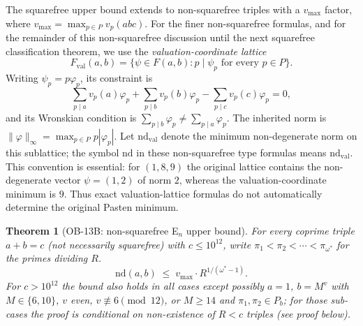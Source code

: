 \documentclass[12pt]{article}
\newtheorem{theorem}{Theorem}
\theoremstyle{definition}
\begin{document}
The squarefree upper bound extends to non-squarefree triples with a
$v_{\max}$ factor, where $v_{\max} = \max_{p \in P} v_p(abc)$.
For the finer non-squarefree formulas, and for the remainder of this
non-squarefree discussion until the next squarefree classification theorem,
we use the \emph{valuation-coordinate lattice}
\[
  F_{\mathrm{val}}(a,b)
  =\{\psi\in F(a,b): p\mid \psi_p \text{ for every } p\in P\}.
\]
Writing $\psi_p=p\varphi_p$, its constraint is
\begin{equation}\label{eq:valuation_constraint}
  \sum_{p\mid a}v_p(a)\varphi_p+
  \sum_{p\mid b}v_p(b)\varphi_p-
  \sum_{p\mid c}v_p(c)\varphi_p=0,
\end{equation}
and its Wronskian condition is
$\sum_{p\mid b}\varphi_p\ne\sum_{p\mid a}\varphi_p$.
The inherited norm is
$\|\varphi\|_\infty=\max_{p\in P}p|\varphi_p|$.
Let $\mathrm{nd}_{\mathrm{val}}$ denote the minimum non-degenerate norm on this
sublattice; the symbol $\mathrm{nd}$ in these non-squarefree type formulas means
$\mathrm{nd}_{\mathrm{val}}$.  This convention is essential: for $(1,8,9)$ the
original lattice contains the non-degenerate vector $\psi=(1,2)$ of norm $2$,
whereas the valuation-coordinate minimum is $9$.  Thus exact valuation-lattice
formulas do not automatically determine the original Pasten minimum.

\begin{theorem}[OB-13B: non-squarefree E$_n$ upper bound]\label{thm:ob13b}
For every coprime triple $a + b = c$ (not necessarily squarefree) with $c \le 10^{12}$,
write $\pi_1<\pi_2<\cdots<\pi_{\omega^*}$ for the primes dividing $R$.
\[
  \mathrm{nd}(a,b) \;\le\; v_{\max} \cdot R^{1/(\omega^*-1)}.
\]
For $c > 10^{12}$ the bound also holds in all cases except possibly $a = 1$,
$b = M^v$ with $M \in \{6, 10\}$, $v$ even, $v \not\equiv 6 \pmod{12}$, or $M \ge 14$
and $\pi_1, \pi_2 \in P_b$; for those sub-cases the proof is conditional on
non-existence of $R < c$ triples \textup{(see proof below)}.
\end{theorem}
\end{document}
